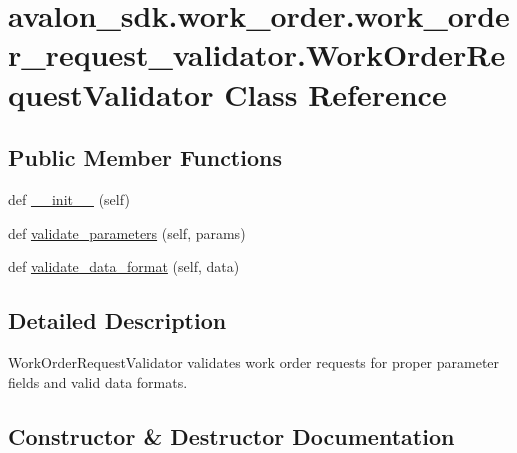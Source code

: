 \hypertarget{classavalon__sdk_1_1work__order_1_1work__order__request__validator_1_1WorkOrderRequestValidator}{}\section{avalon\+\_\+sdk.\+work\+\_\+order.\+work\+\_\+order\+\_\+request\+\_\+validator.\+Work\+Order\+Request\+Validator Class Reference}
\label{classavalon__sdk_1_1work__order_1_1work__order__request__validator_1_1WorkOrderRequestValidator}
\subsection*{Public Member Functions}
\begin{DoxyCompactItemize}
\item 
def \hyperlink{classavalon__sdk_1_1work__order_1_1work__order__request__validator_1_1WorkOrderRequestValidator_a9976477dd6461fd01c02384b2150ec7d}{\+\_\+\+\_\+init\+\_\+\+\_\+} (self)
\item 
def \hyperlink{classavalon__sdk_1_1work__order_1_1work__order__request__validator_1_1WorkOrderRequestValidator_af3b472fe7ef9d4c7c4f0497767d56f40}{validate\+\_\+parameters} (self, params)
\item 
def \hyperlink{classavalon__sdk_1_1work__order_1_1work__order__request__validator_1_1WorkOrderRequestValidator_a6cb47d2ff9acfbc7694055626a504194}{validate\+\_\+data\+\_\+format} (self, data)
\end{DoxyCompactItemize}


\subsection{Detailed Description}
\begin{DoxyVerb}WorkOrderRequestValidator validates work order requests
for proper parameter fields and valid data formats.
\end{DoxyVerb}
 

\subsection{Constructor \& Destructor Documentation}
\mbox{\label{classavalon__sdk_1_1work__order_1_1work__order__request__validator_1_1WorkOrderRequestValidator_a9976477dd6461fd01c02384b2150ec7d}} 
